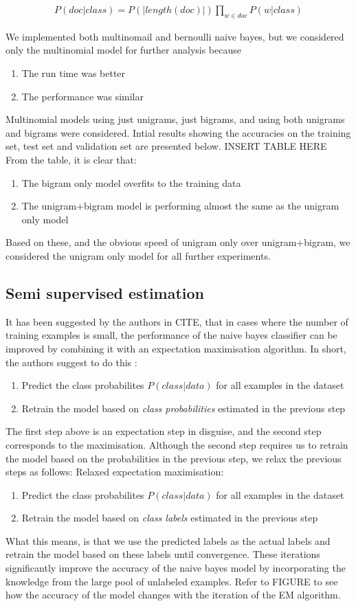 \documentclass{sig-alternate-05-2015}
\begin{document}
\begin{align*}
P(doc|class) = P(|length(doc)|)\prod_{w \in doc}P(w|class)
\end{align*}

We implemented both multinomail and bernoulli naive bayes, but we considered only the multinomial model for further analysis because
\begin{enumerate}
\item The run time was better
\item The performance was similar
\end{enumerate}
Multinomial models using just unigrams, just bigrams, and using both unigrams and bigrams were considered. Intial results showing the accuracies on the training set, test set and validation set are presented below. 
INSERT TABLE HERE
From the table, it is clear that:
\begin{enumerate}
\item The bigram only model overfits to the training data
\item The unigram+bigram model is performing almost the same as the unigram only model
\end{enumerate}
Based on these, and the obvious speed of unigram only over unigram+bigram, we considered the unigram only model for all further experiments. 
\subsection{Semi supervised estimation}
It has been suggested by the authors in CITE, that in cases where the number of training examples is small, the performance of the naive bayes classifier can be improved by combining it with an expectation maximisation algorithm. In short, the authors suggest to do this :
\begin{enumerate}
\item Predict the class probabilites $P(class|data)$ for all examples in the dataset
\item Retrain the model based on \textit{class probabilities} estimated in the previous step
\end{enumerate}
The first step above is an expectation step  in disguise, and the second step corresponds to the maximisation. Although the second step requires us to retrain the model based on the probabilities in the previous step, we relax the previous steps as follows:
Relaxed expectation maximisation:

\begin{enumerate}
\item Predict the class probabilites $P(class|data)$ for all examples in the dataset
\item Retrain the model based on \textit{class labels} estimated in the previous step
\end{enumerate}
What this means, is that we use the predicted labels as the actual labels and retrain the model based on these labels until convergence. These iterations significantly improve the accuracy of the naive bayes model by incorporating the knowledge from the large pool of unlabeled examples. Refer to FIGURE to see how the accuracy of the model changes with the iteration of the EM algorithm. 
\end{document}
